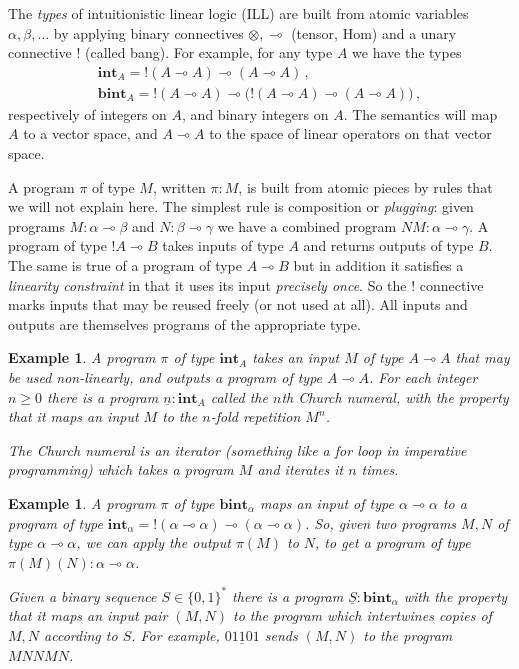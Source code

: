 \documentclass[english,letter paper,12pt,leqno]{article}
\theoremstyle{example}
\newtheorem{example}[theorem]{Example}
\numberwithin{equation}{section}
\begin{document}
The \emph{types} of intuitionistic linear logic (ILL) are built from atomic variables $\alpha, \beta, \ldots$ by applying binary connectives $\otimes, \multimap$ (tensor, Hom) and a unary connective ${!}$ (called bang). For example, for any type $A$ we have the types
\begin{gather*}
\textbf{int}_A = {!}(A \multimap A) \multimap (A \multimap A)\,,\\
\textbf{bint}_A = {!}(A \multimap A) \multimap \big({!}(A \multimap A) \multimap (A \multimap A)\big)\,,
\end{gather*}
respectively of integers on $A$, and binary integers on $A$. The semantics will map $A$ to a vector space, and $A \multimap A$ to the space of linear operators on that vector space.

A program $\pi$ of type $M$, written $\pi : M$, is built from atomic pieces by rules that we will not explain here. The simplest rule is composition or \emph{plugging}: given programs $M : \alpha \multimap \beta$ and $N: \beta \multimap \gamma$ we have a combined program $N M: \alpha \multimap \gamma$. A program of type ${!} A \multimap B$ takes inputs of type $A$ and returns outputs of type $B$. The same is true of a program of type $A \multimap B$ but in addition it satisfies a \emph{linearity constraint} in that it uses its input \emph{precisely once}. So the ${!}$ connective marks inputs that may be reused freely (or not used at all). All inputs and outputs are themselves programs of the appropriate type.

\begin{example} A program $\pi$ of type $\textbf{int}_A$ takes an input $M$ of type $A \multimap A$ that may be used non-linearly, and outputs a program of type $A \multimap A$. For each integer $n \ge 0$ there is a program $\underline{n} : \textbf{int}_A$ called the $n$th \emph{Church numeral}, with the property that it maps an input $M$ to the $n$-fold repetition $M^n$.

The Church numeral is an \emph{iterator} (something like a \emph{for} loop in imperative programming) which takes a program $M$ and iterates it $n$ times.
\end{example}

\begin{example} A program $\pi$ of type $\textbf{bint}_\alpha$ maps an input of type $\alpha \multimap \alpha$ to a program of type $\textbf{int}_\alpha = {!}(\alpha \multimap \alpha) \multimap (\alpha \multimap \alpha)$. So, given two programs $M,N$ of type $\alpha \multimap \alpha$, we can apply the output $\pi(M)$ to $N$, to get a program of type $\pi(M)(N) : \alpha \multimap \alpha$. 

Given a binary sequence $S \in \{0,1\}^*$ there is a program $\underline{S} : \textbf{bint}_\alpha$ with the property that it maps an input pair $(M,N)$ to the program which intertwines copies of $M,N$ according to $S$. For example, $\underline{01101}$ sends $(M,N)$ to the program $M N N M N$.
\end{example}
\end{document}
